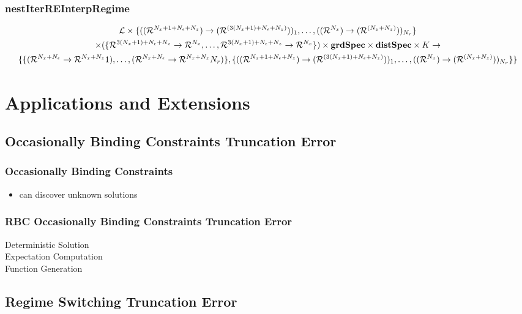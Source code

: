 \documentclass[tikz]{beamer}
\begin{document}
\begin{frame}
\frametitle{nestIterREInterpRegime}
\label{sec:nestiterreinterp}



\begin{gather*}
  \linMod \times 
\{(\lilXRegimeFuncSig)_1,\ldots,(\xzFuncGuessSig)_{\numR}\}  \\
 \times (\eqnRegimeFuncSig ) \times \grdSpec \times \dstSpec  \times \numIters \rightarrow\\
\{\frfpnsRegimeFuncSig, \{(\lilXRegimeFuncSig)_1,\ldots,(\xzFuncGuessSig)_{\numR}\}\}
\end{gather*}


\end{frame}

\section{Applications and Extensions}

\subsection{Occasionally Binding Constraints Truncation Error }




\begin{frame}
\frametitle{Occasionally Binding Constraints}
\begin{itemize}
\item can discover unknown solutions
\end{itemize}



\end{frame}

\begin{frame}
  \frametitle{RBC Occasionally Binding Constraints Truncation Error }
  \begin{description}
  \item[Deterministic Solution] 
  \item[Expectation Computation] 
\item[Function Generation]
  \end{description}

\end{frame}

\subsection{Regime Switching Truncation Error }
\end{document}
